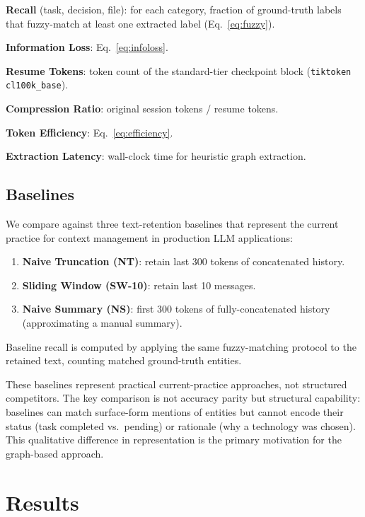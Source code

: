 \documentclass[journal]{IEEEtran}
\begin{document}
\textbf{Recall} (task, decision, file): for each category,
fraction of ground-truth labels that fuzzy-match at least
one extracted label (Eq.~\eqref{eq:fuzzy}).

\textbf{Information Loss}: Eq.~\eqref{eq:infoloss}.

\textbf{Resume Tokens}: token count of the standard-tier
checkpoint block (\texttt{tiktoken cl100k\_base}).

\textbf{Compression Ratio}: original session tokens /
resume tokens.

\textbf{Token Efficiency}: Eq.~\eqref{eq:efficiency}.

\textbf{Extraction Latency}: wall-clock time for heuristic
graph extraction.

\subsection{Baselines}

We compare against three text-retention baselines that
represent the current practice for context management
in production LLM applications:
\begin{enumerate}
\item \textbf{Naive Truncation (NT)}: retain last 300 tokens
  of concatenated history.
\item \textbf{Sliding Window (SW-10)}: retain last 10
  messages.
\item \textbf{Naive Summary (NS)}: first 300 tokens of
  fully-concatenated history (approximating a manual summary).
\end{enumerate}
Baseline recall is computed by applying the same
fuzzy-matching protocol to the retained text,
counting matched ground-truth entities.

These baselines represent practical current-practice
approaches, not structured competitors. The key comparison
is not accuracy parity but structural capability: baselines
can match surface-form mentions of entities but cannot
encode their status (task completed vs.\ pending) or
rationale (why a technology was chosen). This qualitative
difference in representation is the primary motivation
for the graph-based approach.

\section{Results}
\label{sec:results}
\end{document}
